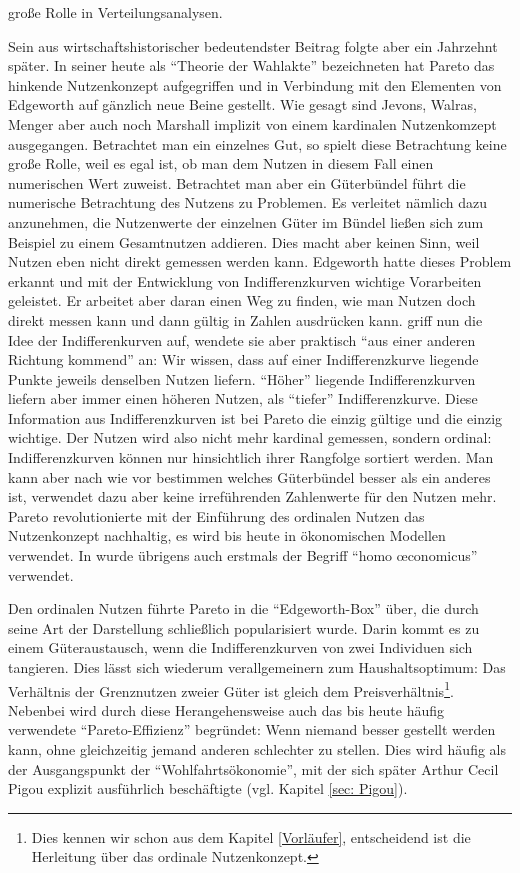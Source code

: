 große Rolle in Verteilungsanalysen.

Sein aus wirtschaftshistorischer bedeutendster Beitrag folgte aber ein Jahrzehnt später. In seiner heute als "`Theorie der Wahlakte"' bezeichneten hat Pareto das hinkende Nutzenkonzept aufgegriffen und in Verbindung mit den Elementen von Edgeworth auf gänzlich neue Beine gestellt. Wie gesagt sind Jevons, Walras, Menger aber auch noch Marshall implizit von einem kardinalen Nutzenkomzept ausgegangen. Betrachtet man ein einzelnes Gut, so spielt diese Betrachtung keine große Rolle, weil es egal ist, ob man dem Nutzen in diesem Fall einen numerischen Wert zuweist. Betrachtet man aber ein Güterbündel führt die numerische Betrachtung des Nutzens zu Problemen. Es verleitet nämlich dazu anzunehmen, die Nutzenwerte der einzelnen Güter im Bündel ließen sich zum Beispiel zu einem Gesamtnutzen addieren. Dies macht aber keinen Sinn, weil Nutzen eben nicht direkt gemessen werden kann. Edgeworth hatte dieses Problem erkannt und mit der Entwicklung von Indifferenzkurven wichtige Vorarbeiten geleistet. Er arbeitet aber daran einen Weg zu finden, wie man Nutzen doch direkt messen kann und dann gültig in Zahlen ausdrücken kann. \textcite{Pareto1906} griff nun die Idee der Indifferenkurven auf, wendete sie aber praktisch "`aus einer anderen Richtung kommend"' an: Wir wissen, dass auf einer Indifferenzkurve liegende Punkte jeweils denselben Nutzen liefern. "`Höher"' liegende Indifferenzkurven liefern aber immer einen höheren Nutzen, als "`tiefer"' Indifferenzkurve. Diese Information aus Indifferenzkurven ist bei Pareto die einzig gültige und die einzig wichtige. Der Nutzen wird also nicht mehr kardinal gemessen, sondern ordinal: Indifferenzkurven können nur hinsichtlich ihrer Rangfolge sortiert werden. Man kann aber nach wie vor bestimmen welches Güterbündel besser als ein anderes ist, verwendet dazu aber keine irreführenden Zahlenwerte für den Nutzen mehr. Pareto revolutionierte mit der Einführung des ordinalen Nutzen das Nutzenkonzept nachhaltig, es wird bis heute in ökonomischen Modellen verwendet. In \textcite{Pareto1906} wurde übrigens auch erstmals der Begriff "`homo \oe conomicus"' verwendet.

Den ordinalen Nutzen führte Pareto in die "`Edgeworth-Box"' über, die durch seine Art der Darstellung schließlich popularisiert wurde. Darin kommt es zu einem Güteraustausch, wenn die Indifferenzkurven von zwei Individuen sich tangieren. Dies lässt sich wiederum verallgemeinern zum Haushaltsoptimum: Das Verhältnis der Grenznutzen zweier Güter ist gleich dem Preisverhältnis\footnote{Dies kennen wir schon aus dem Kapitel \ref{Vorläufer}, entscheidend ist die Herleitung über das ordinale Nutzenkonzept.}. Nebenbei wird durch diese Herangehensweise auch das bis heute häufig verwendete "`Pareto-Effizienz"' begründet: Wenn niemand besser gestellt werden kann, ohne gleichzeitig jemand anderen schlechter zu stellen. Dies wird häufig als der Ausgangspunkt der "`Wohlfahrtsökonomie"', mit der sich später Arthur Cecil Pigou explizit ausführlich beschäftigte (vgl. Kapitel \ref{sec: Pigou}). 


